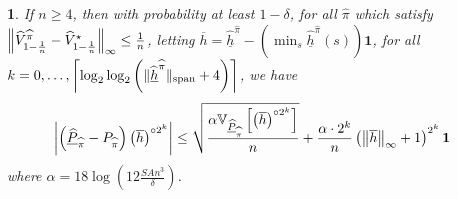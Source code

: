 \documentclass{article}
\theoremstyle{plain}
\theoremstyle{plain}
\newtheorem{lem}[thm]{\protect\lemmaname}
\theoremstyle{remark}
\theoremstyle{plain}
\theoremstyle{plain}
\providecommand{\lemmaname}{Lemma}
\newcommand{\Var}{\mathbb{V}}
\newcommand{\Phat}{\widehat{P}}
\newcommand{\Vhat}{\widehat{V}}
\newcommand{\one}{\mathbf{1}}
\newcommand{\pihat}{\widehat{\pi}}
\newcommand{\Vhatstar}{\widehat{V}^\star}
\newcommand{\hc}{\overline{h}}
\newcommand{\hhat}{\widehat{h}}
\newcommand{\Phatanc}{\underline{\Phat}}
\newcommand{\hhatanc}{\underline{\hhat}}
\begin{document}
\begin{lem}
    \label{lem:LOO_anch_AMDP_bernstein_bound}
    If $n \geq 4$, then with probability at least $1-\delta$, for all $\pihat$ which satisfy $\infnorm{\Vhat_{1-\frac{1}{n}}^{\pihat} - \Vhatstar_{1-\frac{1}{n}}} \leq \frac{1}{n}$, letting $\hc = \hhatanc^{\pihat} - \left(\min_s \hhatanc^{\pihat}(s)\right)\one$, for all $k = 0, \dots, \left\lceil\log_2 \log_2 \left( \spannorm{\hhatanc^{\pihat}} + 4\right) \right\rceil$, we have
    \begin{align*}
        \left| \left(\Phatanc_{\pihat} - P_{\pihat}\right) \left( \hc \right)^{\circ 2^k} \right|
    &\leq \sqrt{\frac{\alpha   \Var_{\Phatanc_{\pihat}} \left[ \left(\hc \right)^{\circ 2^k}  \right]    }{n }} + \frac{ \alpha \cdot 2^k }{n}  \left( \infnorm{\hc} + 1\right)^{2^k}   \one
    \end{align*}
where $\alpha = 18 \log \left(12 \frac{SAn^3}{\delta} \right)$.
\end{lem}
\end{document}
